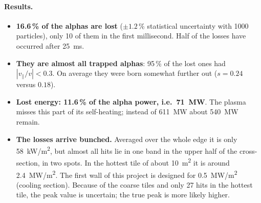 
\paragraph{Results.}
\begin{itemize}\itemsep1pt
\item \textbf{16.6\,\% of the alphas are lost} ($\pm1.2$\,\% statistical uncertainty with 1000 particles), only 10 of
  them in the first millisecond. Half of the losses have occurred after \SI{25}{ms}.
\item \textbf{They are almost all trapped alphas}: 95\,\% of the lost ones had $|v_\parallel/v| < 0.3$. On average they
  were born somewhat further out ($s = 0.24$ versus $0.18$).
\item \textbf{Lost energy: 11.6\,\% of the alpha power, i.e.\ \SI{71}{MW}}. The plasma misses this part of its
  self-heating; instead of \SI{611}{MW} about \SI{540}{MW} remain.
\item \textbf{The losses arrive bunched.} Averaged over the whole edge it is only \SI{58}{kW/m^2}, but almost all hits
  lie in one band in the upper half of the cross-section, in two spots. In the hottest tile of about \SI{10}{m^2} it
  is around \SI{2.4}{MW/m^2}. The first wall of this project is designed for \SI{0.5}{MW/m^2} (cooling section).
  Because of the coarse tiles and only 27 hits in the hottest tile, the peak value is uncertain; the true peak is more
  likely higher.
\end{itemize}

